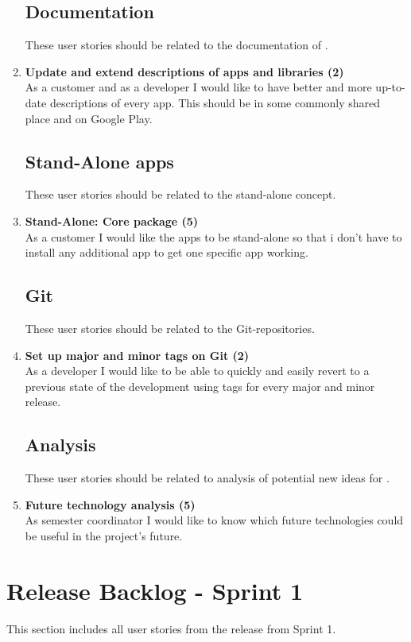 \begin{enumerate}
\subsection{Documentation}
These user stories should be related to the documentation of \giraf.

\item \textbf{Update and extend descriptions of apps and libraries (2)}\\
As a customer and as a developer I would like to have better and more up-to-date descriptions of every app. This should be in some commonly shared place and on Google Play.

\subsection{Stand-Alone apps}
These user stories should be related to the stand-alone concept.

\item \textbf{Stand-Alone: Core package (5)}\\
As a customer I would like the apps to be stand-alone so that i don't have to install any additional app to get one specific app working.

\subsection{Git}
These user stories should be related to the Git-repositories.

\item \textbf{Set up major and minor tags on Git (2)}\\
As a developer I would like to be able to quickly and easily revert to a previous state of the development using tags for every major and minor release.

\subsection{Analysis}
These user stories should be related to analysis of potential new ideas for \giraf.

\item \textbf{Future technology analysis (5)}\\
As semester coordinator I would like to know which future technologies could be useful in the project’s future.

\end{enumerate}

\section{Release Backlog - Sprint 1}
This section includes all user stories from the release from Sprint 1.

